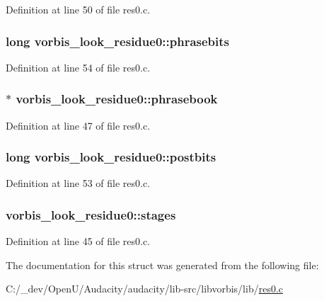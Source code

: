 Definition at line 50 of file res0.\+c.

\subsubsection[{\texorpdfstring{phrasebits}{phrasebits}}]{\setlength{\rightskip}{0pt plus 5cm}long vorbis\+\_\+look\+\_\+residue0\+::phrasebits}\hypertarget{structvorbis__look__residue0_affb93ccf999a975ea35d198193046980}{}\label{structvorbis__look__residue0_affb93ccf999a975ea35d198193046980}


Definition at line 54 of file res0.\+c.

\subsubsection[{\texorpdfstring{phrasebook}{phrasebook}}]{$\ast$ vorbis\+\_\+look\+\_\+residue0\+::phrasebook}\hypertarget{structvorbis__look__residue0_ad405bb6cfed590491d1d9b54239b1356}{}\label{structvorbis__look__residue0_ad405bb6cfed590491d1d9b54239b1356}


Definition at line 47 of file res0.\+c.

\subsubsection[{\texorpdfstring{postbits}{postbits}}]{\setlength{\rightskip}{0pt plus 5cm}long vorbis\+\_\+look\+\_\+residue0\+::postbits}\hypertarget{structvorbis__look__residue0_a40604c8d57e4c9d3af79e1d7f44ed6bb}{}\label{structvorbis__look__residue0_a40604c8d57e4c9d3af79e1d7f44ed6bb}


Definition at line 53 of file res0.\+c.

\subsubsection[{\texorpdfstring{stages}{stages}}]{ vorbis\+\_\+look\+\_\+residue0\+::stages}\hypertarget{structvorbis__look__residue0_a1f6a6208d247971553c5cb4e4b176bd9}{}\label{structvorbis__look__residue0_a1f6a6208d247971553c5cb4e4b176bd9}


Definition at line 45 of file res0.\+c.



The documentation for this struct was generated from the following file\+:\begin{DoxyCompactItemize}
\item 
C\+:/\+\_\+dev/\+Open\+U/\+Audacity/audacity/lib-\/src/libvorbis/lib/\hyperlink{res0_8c}{res0.\+c}\end{DoxyCompactItemize}
